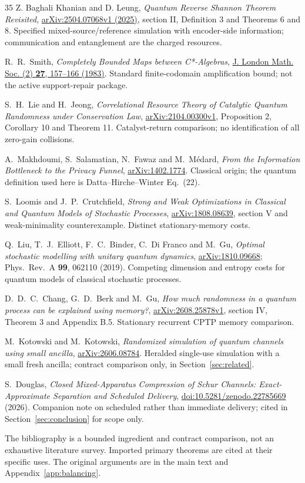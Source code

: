 \documentclass[11pt,a4paper]{article}
\numberwithin{equation}{section}
\theoremstyle{plain}
\theoremstyle{definition}
\begin{document}
\begin{thebibliography}{35}
Z. Baghali Khanian and D. Leung,
\emph{Quantum Reverse Shannon Theorem Revisited},
\href{https://arxiv.org/html/2504.07068v1}{arXiv:2504.07068v1 (2025)},
section II, Definition 3 and Theorems 6 and 8.
Specified mixed-source/reference simulation with encoder-side information;
communication and entanglement are the charged resources.

R.~R.~Smith, \emph{Completely Bounded Maps between C*-Algebras},
\href{https://doi.org/10.1112/jlms/s2-27.1.157}{J. London Math. Soc. (2)
\textbf{27}, 157--166 (1983)}. Standard finite-codomain amplification bound;
not the active support-repair package.

S.~H.~Lie and H.~Jeong, \emph{Correlational Resource Theory of Catalytic
Quantum Randomness under Conservation Law},
\href{https://arxiv.org/html/2104.00300v1}{arXiv:2104.00300v1},
Proposition 2, Corollary 10 and Theorem 11. Catalyst-return comparison;
no identification of all zero-gain collisions.

A.~Makhdoumi, S.~Salamatian, N.~Fawaz and M.~M\'edard,
\emph{From the Information Bottleneck to the Privacy Funnel},
\href{https://arxiv.org/abs/1402.1774}{arXiv:1402.1774}. Classical origin;
the quantum definition used here is Datta--Hirche--Winter Eq.~(22).

S.~Loomis and J.~P.~Crutchfield, \emph{Strong and Weak Optimizations in
Classical and Quantum Models of Stochastic Processes},
\href{https://arxiv.org/abs/1808.08639}{arXiv:1808.08639}, section V and
weak-minimality counterexample. Distinct stationary-memory costs.

Q.~Liu, T.~J.~Elliott, F.~C.~Binder, C.~Di Franco and M.~Gu,
\emph{Optimal stochastic modelling with unitary quantum dynamics},
\href{https://arxiv.org/abs/1810.09668}{arXiv:1810.09668};
Phys.\ Rev.\ A \textbf{99}, 062110 (2019). Competing dimension and entropy
costs for quantum models of classical stochastic processes.

D.~D.~C.~Chang, G.~D.~Berk and M.~Gu,
\emph{How much randomness in a quantum process can be explained using memory?},
\href{https://arxiv.org/html/2608.25878v1}{arXiv:2608.25878v1}, section IV,
Theorem 3 and Appendix B.5. Stationary recurrent CPTP memory comparison.

M.~Kotowski and M.~Kotowski, \emph{Randomized simulation of quantum channels
using small ancilla}, \href{https://arxiv.org/abs/2606.08784}{arXiv:2606.08784}.
Heralded single-use simulation with a small fresh ancilla; contract comparison
only, in Section~\ref{sec:related}.

S.~Douglas, \emph{Closed Mixed-Apparatus Compression of Schur Channels:
Exact-Approximate Separation and Scheduled Delivery},
\href{https://doi.org/10.5281/zenodo.22785669}{doi:10.5281/zenodo.22785669}
(2026). Companion note on scheduled rather than immediate delivery; cited in
Section~\ref{sec:conclusion} for scope only.

\end{thebibliography}
\endgroup

The bibliography is a bounded ingredient and contract comparison, not an
exhaustive literature survey. Imported primary theorems are cited at their
specific uses. The original arguments are in the main text and
Appendix~\ref{app:balancing}.
\end{document}
